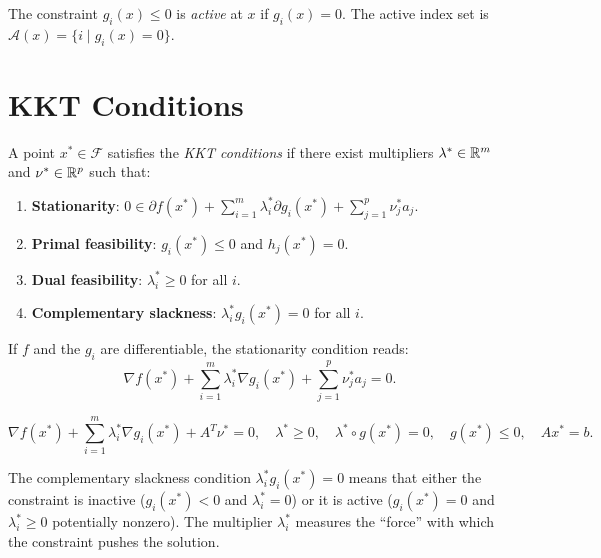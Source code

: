 \begin{definition}
The constraint $g_i(x) \leq 0$ is \emph{active} at $x$ if $g_i(x) = 0$. The active
index set is $\mathcal{A}(x) = \{i \mid g_i(x) = 0\}$.
\end{definition}

\section{KKT Conditions}

\begin{definition}
A point $x^* \in \mathcal{F}$ satisfies the \emph{KKT conditions} if there exist
multipliers $\lambda^* \in \mathbb{R}^m$ and $\nu^* \in \mathbb{R}^p$ such that:
\begin{enumerate}
    \item \textbf{Stationarity}:
    $\displaystyle 0 \in \partial f(x^*) + \sum_{i=1}^m \lambda_i^* \partial g_i(x^*)
    + \sum_{j=1}^p \nu_j^* a_j$.
    \item \textbf{Primal feasibility}: $g_i(x^*) \leq 0$ and $h_j(x^*) = 0$.
    \item \textbf{Dual feasibility}: $\lambda_i^* \geq 0$ for all $i$.
    \item \textbf{Complementary slackness}: $\lambda_i^* g_i(x^*) = 0$ for all $i$.
\end{enumerate}
\end{definition}

If $f$ and the $g_i$ are differentiable, the stationarity condition reads:
\[
    \nabla f(x^*) + \sum_{i=1}^m \lambda_i^* \nabla g_i(x^*) + \sum_{j=1}^p \nu_j^* a_j = 0.
\]

\begin{keyformulas}[title=\textbf{KKT Conditions (Differentiable Case)}]
\[
    \nabla f(x^*) + \sum_{i=1}^m \lambda_i^* \nabla g_i(x^*) + A^T\nu^* = 0, \quad
    \lambda^* \geq 0, \quad
    \lambda^* \circ g(x^*) = 0, \quad
    g(x^*) \leq 0, \quad
    Ax^* = b.
\]
\end{keyformulas}

\begin{intuition}
The complementary slackness condition $\lambda_i^* g_i(x^*) = 0$ means that either
the constraint is inactive ($g_i(x^*) < 0$ and $\lambda_i^* = 0$) or it is active
($g_i(x^*) = 0$ and $\lambda_i^* \geq 0$ potentially nonzero). The multiplier
$\lambda_i^*$ measures the ``force'' with which the constraint pushes the solution.
\end{intuition}

